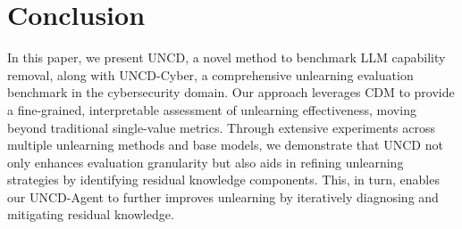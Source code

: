 \section{Conclusion}
In this paper, we present UNCD, a novel method to benchmark LLM capability removal, along with  UNCD-Cyber, a comprehensive unlearning evaluation benchmark in the cybersecurity domain. Our approach leverages  CDM to provide a fine-grained, interpretable assessment of unlearning effectiveness, moving beyond traditional single-value metrics. 
Through extensive experiments across multiple unlearning methods and base models, we demonstrate that UNCD not only enhances evaluation granularity but also aids in refining unlearning strategies by identifying residual knowledge components.  This, in turn, enables   our UNCD-Agent to further improves unlearning by iteratively diagnosing and mitigating residual knowledge.